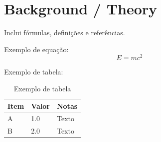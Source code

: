 \section{Background / Theory}
\label{sec:background}

Inclui fórmulas, definições e referências.

Exemplo de equação:
\begin{equation}
  E = mc^2
\end{equation}

Exemplo de tabela:
\begin{table}[H]
  \centering
  \caption{Exemplo de tabela}
  \begin{tabular}{@{}lll@{}}
    \toprule
    \textbf{Item} & \textbf{Valor} & \textbf{Notas} \\
    \midrule
    A & 1.0 & Texto \\
    B & 2.0 & Texto \\
    \bottomrule
  \end{tabular}
\end{table}
